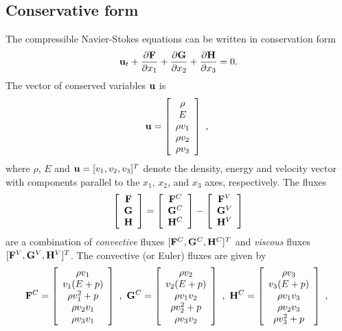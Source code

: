 \documentclass{article}
\begin{document}
\subsection{Conservative form} 
The compressible Navier-Stokes equations can be written in
conservation form
$$
   {\bf u}_t + {\partial {\bf F}\over \partial x_1}
         + {\partial {\bf G}\over \partial x_2}
         + {\partial {\bf H}\over \partial x_3}    =  0 .
$$
The vector of conserved variables ${\bf u}$ is
$$
 {\bf u} = \left[ \begin{array}{c}
    \rho \\ E \\ \rho v_1 \\ \rho v_2  \\  \rho v_3
              \end{array}\right]  ~,~
$$
where $\rho$, $E$ and ${\bf u}=[v_1,v_2,v_3]^T$ denote the density, energy and
velocity vector with components parallel to the $x_1$, $x_2$, and $x_3$ axes, respectively.  The fluxes
$$
  \left[ \begin{array}{c}
    {\bf F} \\ {\bf G} \\ {\bf H}
              \end{array}\right]
 =\left[ \begin{array}{c}
    {\bf F}^C \\ {\bf G}^C \\ {\bf H}^C
              \end{array}\right]
 -\left[ \begin{array}{c}
    {\bf F}^V \\ {\bf G}^V \\ {\bf H}^V
              \end{array}\right]
$$
 are a combination of
{\it convective} fluxes $[{\bf F}^C,{\bf G}^C,{\bf H}^C]^T$ and {\it viscous}
fluxes $[{\bf F}^V,{\bf G}^V,{\bf H}^V]^T$.
The convective (or Euler) fluxes are given by
$$
 {\bf F}^C = \left[ \begin{array}{c}
 \rho v_1 \\ v_1(E+p) \\ \rho v_1^2 + p \\ \rho v_2 v_1 \\ \rho v_3 v_1
                \end{array}\right]  ~,~
 {\bf G}^C = \left[ \begin{array}{c}
 \rho v_2 \\ v_2(E+p) \\ \rho v_1 v_2 \\ \rho v_2^2+p \\ \rho v_3 v_2
                \end{array}\right]  ~,~
 {\bf H}^C = \left[ \begin{array}{c}
 \rho v_3 \\ v_3(E+p) \\ \rho v_1 v_3 \\ \rho v_2 v_3 \\ \rho v_3^2+p
                \end{array}\right]  ~,~
$$
\end{document}
